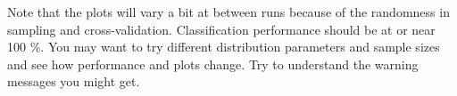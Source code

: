 \documentclass[10pt,a4paper,notitlepage]{report}
\begin{document}
Note that the plots will vary a bit at between runs because of the randomness in sampling and cross-validation. Classification performance should be at or near 100 \%. You may want to try different distribution parameters and sample sizes and see how performance and plots change. Try to understand the warning messages you might get.
\end{document}
